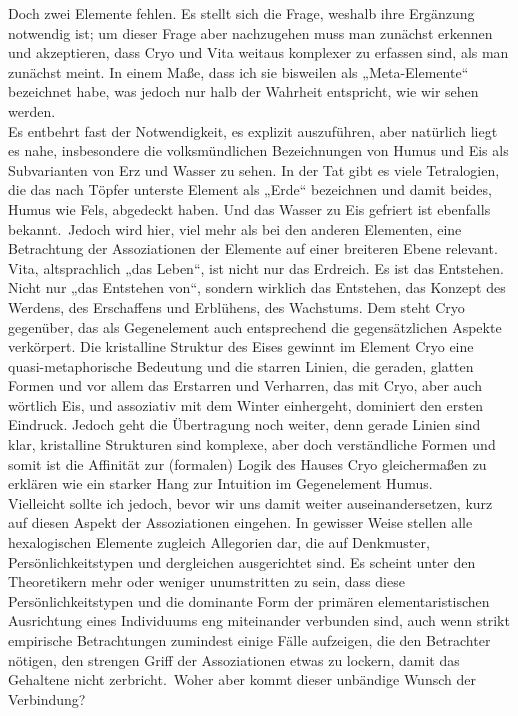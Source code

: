 \documentclass[a5paper,8pt]{book}
\begin{document}
Doch zwei Elemente fehlen. Es stellt sich die Frage, weshalb ihre Ergänzung notwendig ist; um dieser Frage aber nachzugehen muss man zunächst erkennen und akzeptieren, dass 
Cryo und Vita weitaus komplexer zu erfassen sind, als man zunächst meint. In einem Maße, dass ich sie bisweilen als „Meta-Elemente“ bezeichnet habe, was jedoch nur halb der 
Wahrheit entspricht, wie wir sehen werden.\\

Es entbehrt fast der Notwendigkeit, es explizit auszuführen, aber natürlich liegt es nahe, insbesondere die volksmündlichen Bezeichnungen von Humus und Eis als Subvarianten 
von Erz und Wasser zu sehen. In der Tat gibt es viele Tetralogien, die das nach Töpfer unterste Element als „Erde“ bezeichnen und damit beides, Humus wie Fels, abgedeckt 
haben. Und das Wasser zu Eis gefriert ist ebenfalls bekannt.\
Jedoch wird hier, viel mehr als bei den anderen Elementen, eine Betrachtung der Assoziationen der Elemente auf einer breiteren Ebene relevant. Vita, altsprachlich „das Leben“, 
ist nicht nur das Erdreich. Es ist das Entstehen. Nicht nur „das Entstehen von“, sondern wirklich das Entstehen, das Konzept des Werdens, des Erschaffens und Erblühens, des 
Wachstums. Dem steht Cryo gegenüber, das als Gegenelement auch entsprechend die gegensätzlichen Aspekte verkörpert. Die kristalline Struktur des Eises gewinnt im Element Cryo 
eine quasi-metaphorische Bedeutung und die starren Linien, die geraden, glatten Formen und vor allem das Erstarren und Verharren, das mit Cryo, aber auch wörtlich Eis, und 
assoziativ mit dem Winter einhergeht, dominiert den ersten Eindruck. Jedoch geht die Übertragung noch weiter, denn gerade Linien sind klar, kristalline Strukturen sind komplexe, 
aber doch verständliche Formen und somit ist die Affinität zur (formalen) Logik des Hauses Cryo gleichermaßen zu erklären wie ein starker Hang zur Intuition im Gegenelement 
Humus.\\

Vielleicht sollte ich jedoch, bevor wir uns damit weiter auseinandersetzen, kurz auf diesen Aspekt der Assoziationen eingehen.
In gewisser Weise stellen alle hexalogischen Elemente zugleich Allegorien dar, die auf Denkmuster, Persönlichkeitstypen und dergleichen ausgerichtet sind. Es scheint unter den 
Theoretikern mehr oder weniger unumstritten zu sein, dass diese Persönlichkeitstypen und die dominante Form der primären elementaristischen Ausrichtung eines Individuums eng 
miteinander verbunden sind, auch wenn strikt empirische Betrachtungen zumindest einige Fälle aufzeigen, die den Betrachter nötigen, den strengen Griff der Assoziationen etwas 
zu lockern, damit das Gehaltene nicht zerbricht.\
Woher aber kommt dieser unbändige Wunsch der Verbindung?\\
\end{document}
